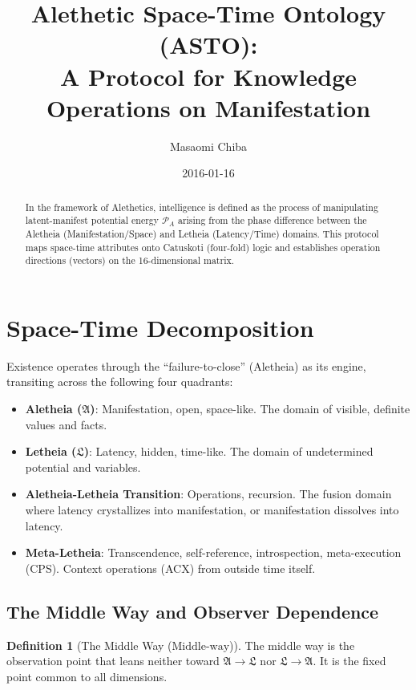 \documentclass[12pt,a4paper]{article}
\title{Alethetic Space-Time Ontology (ASTO):\\
A Protocol for Knowledge Operations on Manifestation}
\author{Masaomi Chiba}
\date{2016-01-16}
\theoremstyle{definition}
\newtheorem{definition}{Definition}[section]
\newcommand{\aletheia}{\mathfrak{A}}
\newcommand{\letheia}{\mathfrak{L}}
\newcommand{\powa}{\mathcal{P}_A}
\newcommand{\mw}{\text{Middle-way}}
\begin{document}
\maketitle

\begin{abstract}
In the framework of Alethetics, intelligence is defined as the process of manipulating latent-manifest potential energy $\powa$ arising from the phase difference between the Aletheia (Manifestation/Space) and Letheia (Latency/Time) domains. This protocol maps space-time attributes onto Catuskoti (four-fold) logic and establishes operation directions (vectors) on the 16-dimensional matrix.
\end{abstract}

\section{Space-Time Decomposition}

Existence operates through the ``failure-to-close'' (Aletheia) as its engine, transiting across the following four quadrants:

\begin{itemize}
    \item \textbf{Aletheia ($\aletheia$)}: Manifestation, open, space-like. The domain of visible, definite values and facts.
    \item \textbf{Letheia ($\letheia$)}: Latency, hidden, time-like. The domain of undetermined potential and variables.
    \item \textbf{Aletheia-Letheia Transition}: Operations, recursion. The fusion domain where latency crystallizes into manifestation, or manifestation dissolves into latency.
    \item \textbf{Meta-Letheia}: Transcendence, self-reference, introspection, meta-execution (CPS). Context operations (ACX) from outside time itself.
\end{itemize}

\subsection{The Middle Way and Observer Dependence}

\begin{definition}[The Middle Way ($\mw$)]
The middle way is the observation point that leans neither toward $\aletheia \to \letheia$ nor $\letheia \to \aletheia$. It is the fixed point common to all dimensions.
\end{definition}
\end{document}
